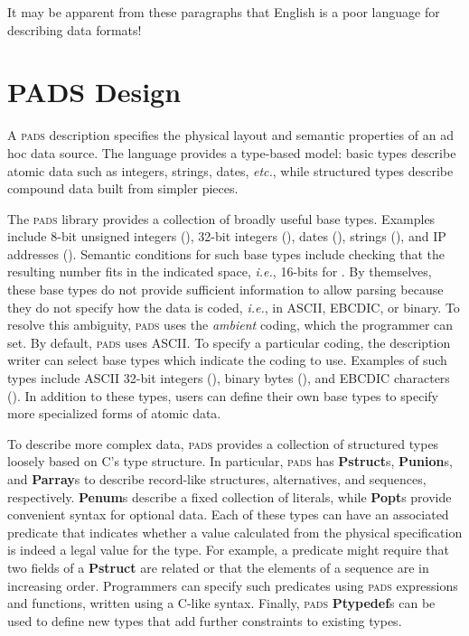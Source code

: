 \documentclass{sigplanconf}
\newcommand{\ie}{{\em i.e.}}
\newcommand{\etc}{{\em etc.\/}}
\newcommand{\bftt}[1]{{\ttfamily\bfseries{#1}}}
\newcommand{\kw}[1]{\bftt{#1}}
\newcommand{\pads}{\textsc{pads}}
\newcommand{\C}{\textsc{C}}
\begin{document}
It may be apparent from these paragraphs that English is a poor
language for describing data formats!


\section{PADS Design}

A \pads{} description specifies the physical layout and 
semantic properties of an ad hoc data source. 
The language provides a type-based model:
basic types describe atomic data such as integers, strings, dates, \etc{}, while
structured types describe compound data built from simpler pieces.
\suppressfloats

The \pads{} library provides a collection of broadly useful base types.
Examples include
8-bit unsigned integers (),
32-bit integers (),
dates (), strings (), and IP addresses ().
Semantic conditions for such base types include checking that the
resulting number fits in the indicated space, \ie{}, 16-bits for
.
By themselves, these base types do not provide sufficient information to allow parsing
because they do not specify how the data is coded, \ie{}, in ASCII, EBCDIC, or binary.  
To resolve this ambiguity, \pads{} uses the \textit{ambient} coding, which the programmer can set.  By default,
\pads{} uses ASCII.  To specify a particular coding, the description writer can select
base types which indicate the coding to use.  Examples of such types include
ASCII 32-bit integers (), binary bytes (), and
EBCDIC characters ().  
In addition to these types,  users can define their own base types to specify more
specialized forms of atomic data.  

To describe more complex data, \pads{} provides a collection of 
structured types loosely based on \C{}'s type structure.
In particular, \pads{} has 
\kw{Pstruct}s, \kw{Punion}s, and \kw{Parray}s to describe
record-like structures, alternatives, and sequences, respectively.
\kw{Penum}s describe a fixed collection of literals, while \kw{Popt}s 
provide convenient syntax for optional data.
Each of these
types can have an associated predicate that indicates whether a
value calculated from the physical specification is indeed a legal
value for the type.  For example, a predicate might require that two
fields of a \kw{Pstruct} are related or that the elements
of a sequence are in increasing order.  Programmers can specify such
predicates using \pads{} expressions and functions, 
written using a \C{}-like syntax.
Finally, \pads{} \kw{Ptypedef}s can be used
to define new types that add further constraints to existing types.
\end{document}
